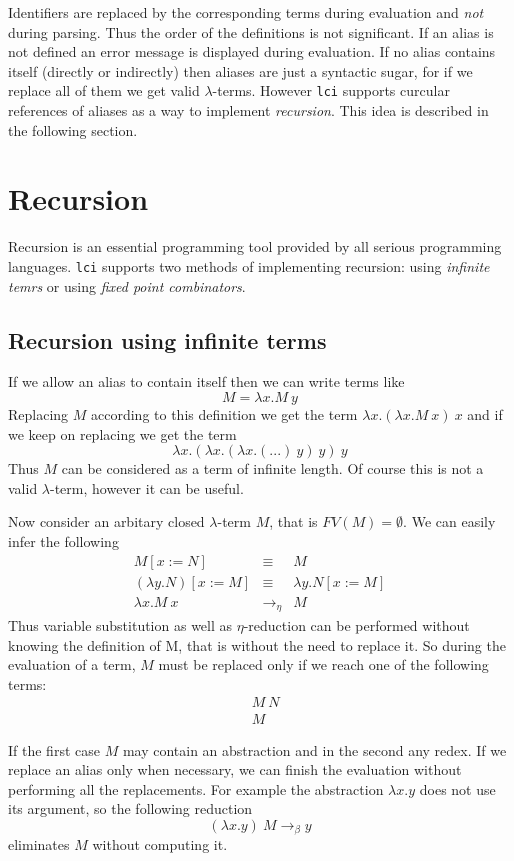 \documentclass[a4paper,11pt]{article}
\newcommand{\la}{$\lambda$}
\newcommand{\lci}{\texttt{lci}}
\begin{document}
Identifiers are replaced by the corresponding terms during evaluation and \emph{not}
during parsing. Thus the order of the definitions is not significant. If an alias
is not defined an error message is displayed during evaluation. If no alias
contains itself (directly or indirectly) then aliases are just a syntactic sugar,
for if we replace all of them we get valid \la-terms. However \lci{} supports
curcular references of aliases as a way to implement \emph{recursion}. This
idea is described in the following section.

\section{Recursion}
Recursion is an essential programming tool provided by all serious programming
languages. \lci{} supports two methods of implementing recursion: using
\emph{infinite temrs} or using \emph{fixed point combinators}.

\subsection{Recursion using infinite terms}
\label{par_recinf}
If we allow an alias to contain itself then we can write terms like
\[ M = \lambda x.M\ y \]
Replacing $M$ according to this definition we get the term $\lambda x.(\lambda x.M\ x)\ x$
and if we keep on replacing we get the term
\[ \lambda x.(\lambda x.(\lambda x.(...)\ y)\ y)\ y \]
Thus $M$ can be considered as a term of infinite length. Of course this is not
a valid \la-term, however it can be useful.

Now consider an arbitary closed \la-term $M$, that is $FV(M) = \emptyset$. We
can easily infer the following
\[
	\begin{array}{lcl}
		M[x:=N] & \equiv & M \\
		(\lambda y.N)[x:=M] & \equiv & \lambda y.N[x:=M] \\
		\lambda x.M\ x & \rightarrow_\eta & M
	\end{array}
\]
Thus variable substitution as well as $\eta$-reduction can be performed without
knowing the definition of M, that is without the need to replace it. So during
the evaluation of a term, $M$ must be replaced only if we reach one of the
following terms:
\begin{eqnarray}
	& M\ N \\
	& M
\end{eqnarray}

If the first case $M$ may contain an abstraction and in the second any redex.
If we replace an alias only when necessary, we can finish the evaluation without
performing all the replacements. For example the abstraction $\lambda x.y$ does
not use its argument, so the following reduction
\[ (\lambda x.y)\ M \rightarrow_\beta y \]
eliminates $M$ without computing it.
\end{document}
